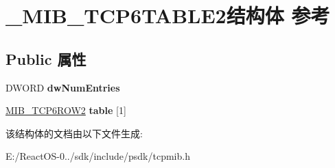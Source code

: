 \hypertarget{struct___m_i_b___t_c_p6_t_a_b_l_e2}{}\section{\+\_\+\+M\+I\+B\+\_\+\+T\+C\+P6\+T\+A\+B\+L\+E2结构体 参考}
\label{struct___m_i_b___t_c_p6_t_a_b_l_e2}
\subsection*{Public 属性}
\begin{DoxyCompactItemize}
\item 
\mbox{\label{struct___m_i_b___t_c_p6_t_a_b_l_e2_a199cdcbe1bc96f295af1837eab474316}} 
D\+W\+O\+RD {\bfseries dw\+Num\+Entries}
\item 
\mbox{\label{struct___m_i_b___t_c_p6_t_a_b_l_e2_a90f4dc3db2626ffd887c69e82b5827ed}} 
\hyperlink{struct___m_i_b___t_c_p6_r_o_w2}{M\+I\+B\+\_\+\+T\+C\+P6\+R\+O\+W2} {\bfseries table} \mbox{[}1\mbox{]}
\end{DoxyCompactItemize}


该结构体的文档由以下文件生成\+:\begin{DoxyCompactItemize}
\item 
E\+:/\+React\+O\+S-\/0../sdk/include/psdk/tcpmib.\+h\end{DoxyCompactItemize}
